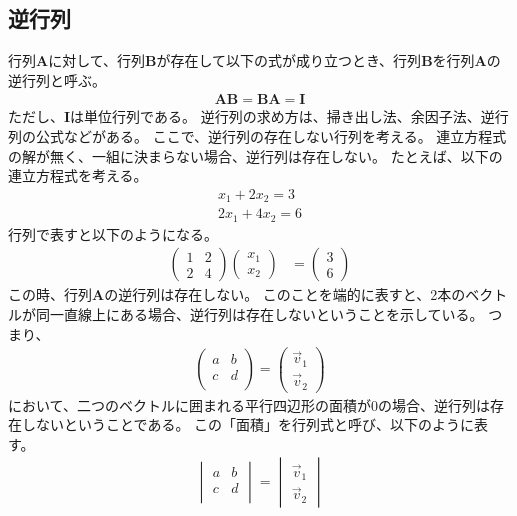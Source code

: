 \documentclass{ltjsarticle}
\begin{document}
\subsection{逆行列}
行列$\mathbf{A}$に対して、行列$\mathbf{B}$が存在して以下の式が成り立つとき、行列$\mathbf{B}$を行列$\mathbf{A}$の逆行列と呼ぶ。
\begin{align}
\mathbf{A} \mathbf{B} = \mathbf{B} \mathbf{A} = \mathbf{I}
\end{align}
ただし、$\mathbf{I}$は単位行列である。
逆行列の求め方は、掃き出し法、余因子法、逆行列の公式などがある。
ここで、逆行列の存在しない行列を考える。
連立方程式の解が無く、一組に決まらない場合、逆行列は存在しない。
たとえば、以下の連立方程式を考える。
\begin{align}
  x_1 + 2x_2 = 3 \\
  2x_1 + 4x_2 = 6
\end{align}
行列で表すと以下のようになる。
\begin{align}
\begin{pmatrix}
  1 & 2 \\
  2 & 4
\end{pmatrix}
\begin{pmatrix}
  x_1 \\
  x_2
\end{pmatrix}
&=
\begin{pmatrix}
  3 \\
  6
\end{pmatrix}
\end{align}
この時、行列$\mathbf{A}$の逆行列は存在しない。
このことを端的に表すと、2本のベクトルが同一直線上にある場合、逆行列は存在しないということを示している。
つまり、
\begin{align}
\begin{pmatrix}
  a & b \\
  c & d \\
\end{pmatrix}
=
\begin{pmatrix}
  \vec{v}_1 \\
  \vec{v}_2
\end{pmatrix}
\end{align}
において、二つのベクトルに囲まれる平行四辺形の面積が0の場合、逆行列は存在しないということである。
この「面積」を行列式と呼び、以下のように表す。
\begin{align}
\begin{vmatrix}
  a & b \\
  c & d \\
\end{vmatrix}
=
\begin{vmatrix}
  \vec{v}_1 \\
  \vec{v}_2
\end{vmatrix}
\end{align}
\end{document}

